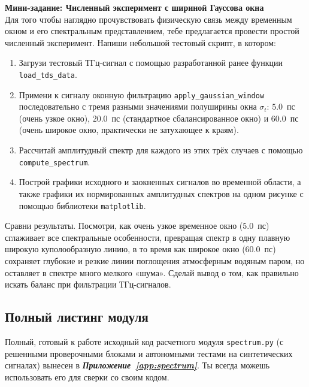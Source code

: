 \begin{minitaskbox}
	\textbf{Мини-задание: Численный эксперимент с шириной Гауссова окна} \\
	Для того чтобы наглядно прочувствовать физическую связь между временным окном и его спектральным представлением, тебе предлагается провести простой численный эксперимент. Напиши небольшой тестовый скрипт, в котором:
	\begin{enumerate}
		\item Загрузи тестовый ТГц-сигнал с помощью разработанной ранее функции \texttt{load\_tds\_data}.
		\item Примени к сигналу оконную фильтрацию \texttt{apply\_gaussian\_window} последовательно с тремя разными значениями полуширины окна $\sigma_t$: $5.0$~пс (очень узкое окно), $20.0$~пс (стандартное сбалансированное окно) и $60.0$~пс (очень широкое окно, практически не затухающее к краям).
		\item Рассчитай амплитудный спектр для каждого из этих трёх случаев с помощью \texttt{compute\_spectrum}.
		\item Построй графики исходного и заокненных сигналов во временной области, а также графики их нормированных амплитудных спектров на одном рисунке с помощью библиотеки \texttt{matplotlib}.
	\end{enumerate}
	Сравни результаты. Посмотри, как очень узкое временное окно ($5.0$~пс) сглаживает все спектральные особенности, превращая спектр в одну плавную широкую куполообразную линию, в то время как широкое окно ($60.0$~пс) сохраняет глубокие и резкие линии поглощения атмосферным водяным паром, но оставляет в спектре много мелкого «шума». Сделай вывод о том, как правильно искать баланс при фильтрации ТГц-сигналов.
\end{minitaskbox}

\subsection{Полный листинг модуля}

Полный, готовый к работе исходный код расчетного модуля \texttt{spectrum.py} (с решенными проверочными блоками и автономными тестами на синтетических сигналах) вынесен в \textbf{\textit{Приложение~\ref{app:spectrum}}}. Ты всегда можешь использовать его для сверки со своим кодом.

